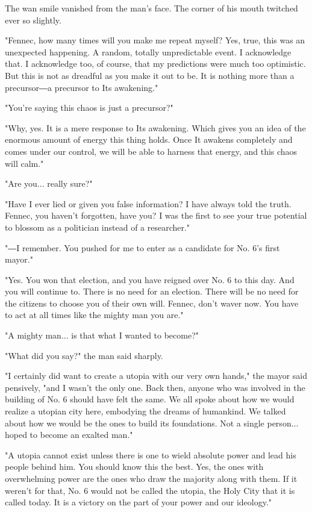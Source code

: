 The wan smile vanished from the man's face. The corner of his mouth
twitched ever so slightly.

"Fennec, how many times will you make me repeat myself? Yes, true, this
was an unexpected happening. A random, totally unpredictable event. I
acknowledge that. I acknowledge too, of course, that my predictions were
much too optimistic. But this is not as dreadful as you make it out to
be. It is nothing more than a precursor―a precursor to Its awakening."

"You're saying this chaos is just a precursor?"

"Why, yes. It is a mere response to Its awakening. Which gives you an
idea of the enormous amount of energy this thing holds. Once It awakens
completely and comes under our control, we will be able to harness that
energy, and this chaos will calm."

"Are you... really sure?"

"Have I ever lied or given you false information? I have always told the
truth. Fennec, you haven't forgotten, have you? I was the first to see
your true potential to blossom as a politician instead of a researcher."

"―I remember. You pushed for me to enter as a candidate for No. 6's
first mayor."

"Yes. You won that election, and you have reigned over No. 6 to this
day. And you will continue to. There is no need for an election. There
will be no need for the citizens to choose you of their own will.
Fennec, don't waver now. You have to act at all times like the mighty
man you are."

"A mighty man... is that what I wanted to become?"

"What did you say?" the man said sharply.

"I certainly did want to create a utopia with our very own hands," the
mayor said pensively, "and I wasn't the only one. Back then, anyone who
was involved in the building of No. 6 should have felt the same. We all
spoke about how we would realize a utopian city here, embodying the
dreams of humankind. We talked about how we would be the ones to build
its foundations. Not a single person... hoped to become an exalted man."

"A utopia cannot exist unless there is one to wield absolute power and
lead his people behind him. You should know this the best. Yes, the ones
with overwhelming power are the ones who draw the majority along with
them. If it weren't for that, No. 6 would not be called the utopia, the
Holy City that it is called today. It is a victory on the part of your
power and our ideology."

